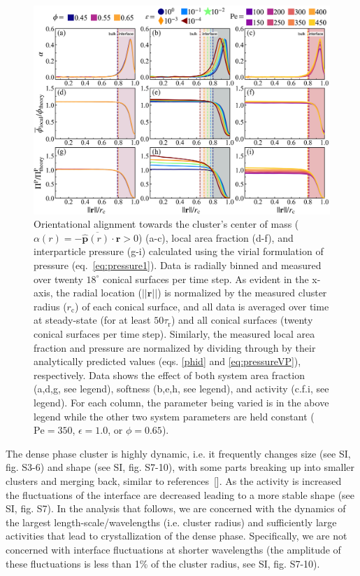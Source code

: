 \documentclass[twoside,twocolumn,9pt]{article}
\begin{document}
\begin{figure}[bt!]
\centering
  \includegraphics[width=1.0\textwidth]{figure_5.png}
  \caption{Orientational alignment towards the cluster's center of mass ($\alpha(r)=\overline{-\hat{\mathbf{p}}(r)\cdot \mathbf{r}}>0$) (a-c), local area fraction (d-f), and interparticle pressure (g-i) calculated using the virial formulation of pressure (eq.~\ref{eq:pressure1}).  Data is radially binned and measured over twenty $18^\circ$ conical surfaces per time step. As evident in the x-axis, the radial location ($||\mathbf{r}||$) is normalized by the measured cluster radius ($r_\text{c}$) of each conical surface, and all data is averaged over time at steady-state (for at least $50\tau_\text{r}$) and all conical surfaces (twenty conical surfaces per time step). Similarly, the measured local area fraction and pressure are normalized by dividing through by their analytically predicted values (eqs. \ref{phid} and \ref{eq:pressureVP}), respectively. Data shows the effect of both system area fraction (a,d,g, see legend), softness (b,e,h, see legend), and activity (c.f.i, see legend). For each column, the parameter being varied is in the above legend while the other two system parameters are held constant ($\mathrm{Pe}=350$, $\epsilon=1.0$, or $\phi=0.65$).  }
  \label{radial}
\end{figure}

The dense phase cluster is highly dynamic, i.e. it frequently changes size (see SI, fig. S3-6) and shape (see SI, fig. S7-10), with some parts breaking up into smaller clusters and merging back, similar to references~[]. As the activity is increased the fluctuations of the interface are decreased leading to a more stable shape (see SI, fig. S7). In the analysis that follows, we are concerned with the dynamics of the largest length-scale/wavelengths (i.e. cluster radius) and sufficiently large activities that lead to crystallization of the dense phase. Specifically, we are not concerned with interface fluctuations at shorter wavelengths (the amplitude of these fluctuations is less than 1\% of the cluster radius, see SI, fig. S7-10). 
\end{document}
